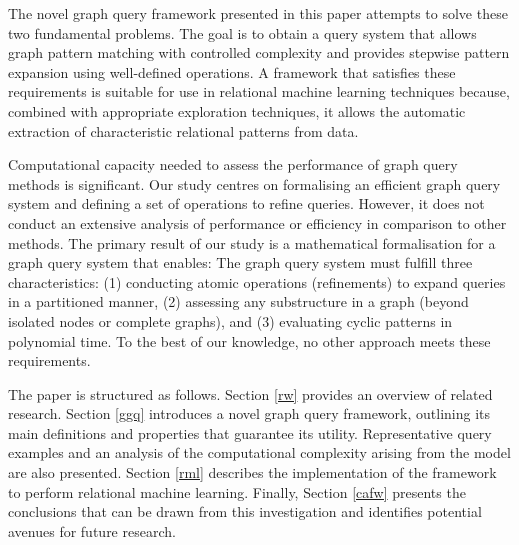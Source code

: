 \documentclass{article}%
\begin{document}
The novel graph query framework presented in this paper attempts to solve these two fundamental problems. The goal is to obtain a query system that allows graph pattern matching with controlled complexity and provides stepwise pattern expansion using well-defined operations. A framework that satisfies these requirements is suitable for use in relational machine learning techniques because, combined with appropriate exploration techniques, it allows the automatic extraction of characteristic relational patterns from data. 

Computational capacity needed to assess the performance of graph query methods is significant. Our study centres on formalising an efficient graph query system and defining a set of operations to refine queries. However, it does not conduct an extensive analysis of performance or efficiency in comparison to other methods. The primary result of our study is a mathematical formalisation for a graph query system that enables: The graph query system must fulfill three characteristics: (1) conducting atomic operations (refinements) to expand queries in a partitioned manner, (2) assessing any substructure in a graph (beyond isolated nodes or complete graphs), and (3) evaluating cyclic patterns in polynomial time. To the best of our knowledge, no other approach meets these requirements.

The paper is structured as follows. Section \ref{rw} provides an overview of related research. Section \ref{ggq} introduces a novel graph query framework, outlining its main definitions and properties that guarantee its utility. Representative query examples and an analysis of the computational complexity arising from the model are also presented. Section \ref{rml} describes the implementation of the framework to perform relational machine learning. Finally, Section \ref{cafw} presents the conclusions that can be drawn from this investigation and identifies potential avenues for future research.%
\end{document}
